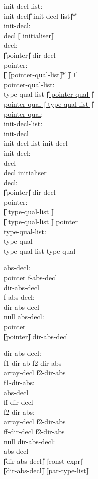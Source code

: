 \begin{center}
\PAIR 
{
init-decl-list: \\
\>	init-decl\U{[}\T{,} init-decl-list\U{]}\U{*}\\
init-decl: \\
\>	decl \U{[}\T{=} initialiser\U{]} \\
decl: \\  
\>	\U{[}pointer\U{]} dir-decl \\
pointer: \\ 
\>	\U{[}\T{*} \U{[}pointer-qual-list\U{]}\U{*} \U{]} \U{+}\\
pointer-qual-list:\\
\>	type-qual-list  \underline{\U{[} pointer-qual \U{]}} \\
\>	\underline{pointer-qual \U{[} type-qual-list \U{]}}\\
\underline{pointer-qual}:  \\
\>        
}
{
init-decl-list: \\
\>	init-decl \\
\>	init-decl-list \T{,} init-decl \\
init-decl: \\
\>	decl \\
\>	decl \T{=} initialiser \\
decl: \\
\>	\U{[}pointer\U{]} dir-decl \\
pointer: \\
\>	\T{*} \U{[} type-qual-list \U{]} \\
\>	\T{*} \U{[} type-qual-list \U{]} pointer \\
type-qual-list:\\
\> 	type-qual\\
\>      type-qual-list type-qual 
}


\PAIR
{ 
abs-decl:\\
\>	pointer f-abs-decl\\
\>	dir-abs-decl\\
f-abs-decl: \\
\>	dir-abs-decl\\
\>	null 
}
{
abs-decl:\\
\>	pointer\\
\>	\U{[}pointer\U{]} dir-abs-decl
}

\PAIR
{
dir-abs-decl:\\
\>	\T{(} f1-dir-ab f2-dir-abs\\
\>       array-decl  f2-dir-abs\\
f1-dir-abs:\\
\>	abs-decl \T{)}\\
\>	 ff-dir-decl\\
f2-dir-abs:\\
\>	array-decl f2-dir-abs\\
\>	\T{(} ff-dir-decl f2-dir-abs \\
\>	null
}
{
dir-abs-decl:\\
\>	\T{(} abs-decl \T{)}\\
\>	\U{[}dir-abs-decl\U{]}\T{[} \U{[}const-expr\U{]} \T{]}\\
\>	\U{[}dir-abs-decl\U{]} \T{(} \U{[}par-type-list\U{]} \T{)}
}



\end{center}
